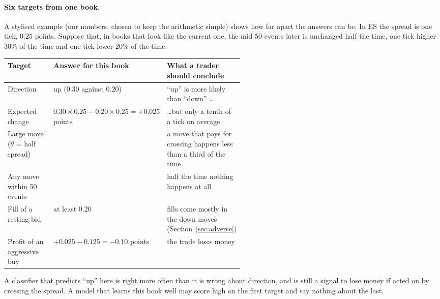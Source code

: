 \paragraph{Six targets from one book.} A stylised example (our numbers, chosen to keep the arithmetic simple) shows how
far apart the answers can be. In ES the spread is one tick, 0.25 points. Suppose that, in books that look like the
current one, the mid 50 events later is unchanged half the time, one tick higher 30\% of the time and one tick lower
20\% of the time.
\begin{center}\footnotesize
\begin{tabularx}{\linewidth}{>{\raggedright\arraybackslash}p{0.24\linewidth}>{\raggedright\arraybackslash}p{0.3\linewidth}>{\raggedright\arraybackslash}X}
\toprule
Target & Answer for this book & What a trader should conclude \\
\midrule
Direction & up (0.30 against 0.20) & ``up'' is more likely than ``down'' \ldots \\
Expected change & $0.30 \times 0.25 - 0.20 \times 0.25 = +0.025$ points & \ldots but only a tenth of a tick on average \\
Large move ($\theta$ = half spread) & 0.30 & a move that pays for crossing happens less than a third of the time \\
Any move within 50 events & 0.50 & half the time nothing happens at all \\
Fill of a resting bid & at least 0.20 & fills come mostly in the down moves (Section~\ref{sec:adverse}) \\
Profit of an aggressive buy & $+0.025 - 0.125 = -0.10$ points & the trade loses money \\
\bottomrule
\end{tabularx}
\end{center}
A classifier that predicts ``up'' here is right more often than it is wrong about direction, and is still a
signal to lose money if acted on by crossing the spread. A model that learns this book well may score high on
the first target and say nothing about the last.

